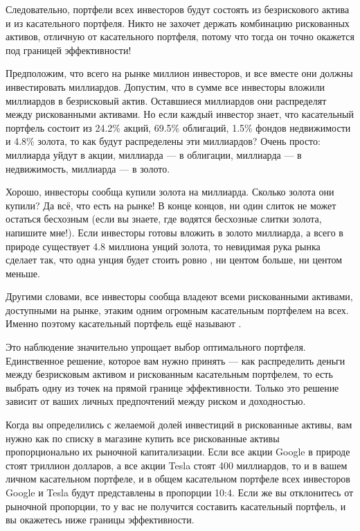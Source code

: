 Следовательно, портфели всех инвесторов будут состоять из безрискового актива и 
из касательного портфеля. Никто не захочет держать комбинацию рискованных 
активов, отличную от касательного портфеля, потому что тогда он точно окажется 
под границей эффективности!

Предположим, что всего на рынке миллион инвесторов, и все вместе они должны 
инвестировать  миллиардов. Допустим, что в сумме все инвесторы 
вложили  миллиардов в безрисковый актив. Оставшиеся  
миллиардов они распределят между рискованными активами. Но если каждый инвестор 
знает, что касательный портфель состоит из 24.2\% акций, 69.5\% облигаций, 1.5\% 
фондов недвижимости и 4.8\% золота, то как будут распределены эти  
миллиардов? Очень просто:  миллиарда уйдут в акции,  
миллиарда --- в облигации,  миллиарда --- в недвижимость, 
 миллиарда --- в золото.

Хорошо, инвесторы сообща купили золота на  миллиарда. Сколько 
золота они купили? Да всё, что есть на рынке! В конце концов, ни один слиток не 
может остаться бесхозным (если вы знаете, где водятся бесхозные слитки золота, 
напишите мне!). Если инвесторы готовы вложить в золото  миллиарда, 
а всего в природе существует 4.8 миллиона унций золота, то невидимая рука рынка 
сделает так, что одна унция будет стоить ровно , ни центом больше, 
ни центом меньше.

Другими словами, все инвесторы сообща владеют всеми рискованными активами, 
доступными на рынке, этаким одним огромным касательным портфелем на всех. Именно 
поэтому касательный портфель ещё называют .

Это наблюдение значительно упрощает выбор оптимального портфеля. Единственное 
решение, которое вам нужно принять --- как распределить деньги между безрисковым 
активом и рискованным касательным портфелем, то есть выбрать одну из точек на 
прямой границе эффективности. Только это решение зависит от ваших личных
предпочтений между риском и доходностью.

Когда вы определились с желаемой долей инвестиций в рискованные активы, вам 
нужно как по списку в магазине купить все рискованные активы пропорционально их 
рыночной капитализации. Если все акции Google в природе стоят триллион долларов, 
а все акции Tesla стоят 400 миллиардов, то и в вашем личном касательном 
портфеле, и в общем касательном портфеле всех инвесторов Google и Tesla будут 
представлены в пропорции 10:4. Если же вы отклонитесь от рыночной пропорции, то 
у вас не получится составить касательный портфель, и вы окажетесь ниже границы 
эффективности.

